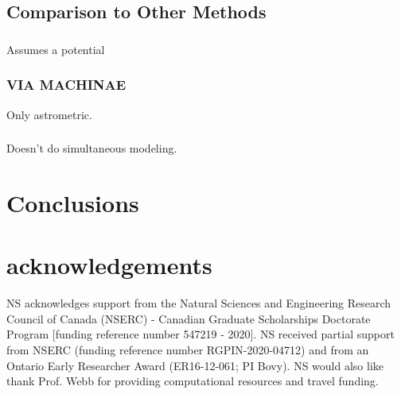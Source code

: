 \documentclass[twocolumn]{aastex631}
\begin{document}
    \subsection{Comparison to Other Methods} \label{sec:comparison}

        \subsubsection[STREAMFINDER]{\cite{STREAMFINDER}}
    
            Assumes a potential
    
    
        \subsubsection{VIA MACHINAE}{\cite{Shih+2022}}

            Only astrometric.
    
    
        \subsubsection[Uniform Modeling of 13 Stellar
        Streams]{\cite{Patrick+2022}}

            Doesn't do simultaneous modeling.
    


\section{Conclusions} \label{sec:conclusions}




\section{acknowledgements}

    NS acknowledges support from the Natural Sciences and Engineering Research
    Council of Canada (NSERC) - Canadian Graduate Scholarships Doctorate Program
    [funding reference number 547219 - 2020].  NS received partial support from
    NSERC (funding reference number RGPIN-2020-04712) and from an Ontario Early
    Researcher Award (ER16-12-061; PI Bovy). NS would also like thank Prof. Webb
    for providing computational resources and travel funding.
\end{document}

